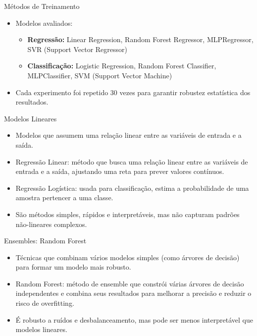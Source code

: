 \documentclass[aspectratio=169]{beamer}
\begin{document}
\begin{frame}{Métodos de Treinamento}
  \begin{itemize}
    \item Modelos avaliados:
      \begin{itemize}
        \item \textbf{Regressão:} Linear Regression, Random Forest Regressor, MLPRegressor, SVR (Support Vector Regressor)
        \item \textbf{Classificação:} Logistic Regression, Random Forest Classifier, MLPClassifier, SVM (Support Vector Machine)
      \end{itemize}
    \item Cada experimento foi repetido 30 vezes para garantir robustez estatística dos resultados.
  \end{itemize}
\end{frame}

  \begin{frame}{Modelos Lineares}
    \begin{itemize}
    \item Modelos que assumem uma relação linear entre as variáveis de entrada e a saída.
    \item Regressão Linear: método que busca uma relação linear entre as variáveis de entrada e a saída, ajustando uma reta para prever valores contínuos.
    \item Regressão Logística: usada para classificação, estima a probabilidade de uma amostra pertencer a uma classe.
    \item São métodos simples, rápidos e interpretáveis, mas não capturam padrões não-lineares complexos.
    \end{itemize}
  \end{frame}

  \begin{frame}{Ensembles: Random Forest}
    \begin{itemize}
    \item Técnicas que combinam vários modelos simples (como árvores de decisão) para formar um modelo mais robusto.
    \item Random Forest: método de ensemble que constrói várias árvores de decisão independentes e combina seus resultados para melhorar a precisão e reduzir o risco de overfitting.
    \item É robusto a ruídos e desbalanceamento, mas pode ser menos interpretável que modelos lineares.
    \end{itemize}
  \end{frame}
\end{document}
